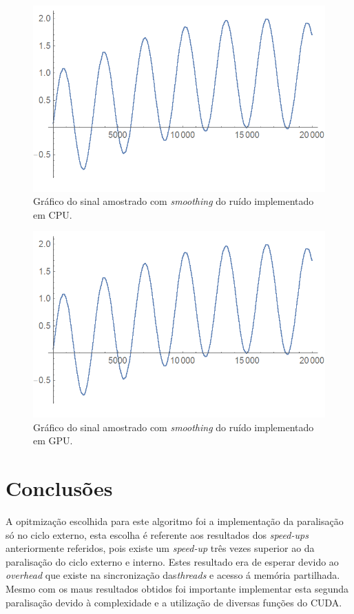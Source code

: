 \documentclass[11pt]{article}
\numberwithin{equation}{section}
\begin{document}
\begin{figure}[H]
	\centering
	\includegraphics[keepaspectratio=true, scale=0.6]{print1}
	\vspace{-0.5em}
	\caption{Gráfico do sinal amostrado com \textit{smoothing} do ruído implementado em CPU.}
	\vspace{-0.8em}
	\label{fig:imag of i}
\end{figure} 

\begin{figure}[H]
	\centering
	\includegraphics[keepaspectratio=true, scale=0.6]{print1}
	\vspace{-0.5em}
	\caption{Gráfico do sinal amostrado com \textit{smoothing} do ruído implementado em GPU.}
	\vspace{-0.8em}
	\label{fig:imag of i}
\end{figure} 



\section{Conclusões}
 A opitmização escolhida para este algoritmo foi a implementação da paralisação só no ciclo externo, esta escolha é referente aos resultados dos \textit{speed-ups} anteriormente referidos, pois existe um \textit{speed-up} três vezes superior ao da paralisação do ciclo externo e interno. Estes resultado era de esperar devido ao \textit{overhead} que existe na sincronização das\textit{threads} e acesso á memória partilhada. Mesmo com os maus resultados obtidos foi importante implementar esta segunda paralisação devido à complexidade e a utilização de diversas funções do CUDA.
\end{document}
